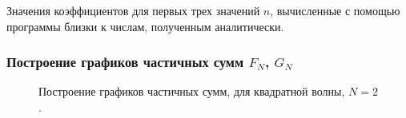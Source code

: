 \documentclass[a5paper, 10pt]{article}
\theoremstyle{definition}
\theoremstyle{plain}
\theoremstyle{remark}
\begin{document}
Значения коэффициентов для первых трех значений $n$, вычисленные с помощью программы близки к числам, полученным аналитически.

\subsubsection{Построение графиков частичных сумм $F_N$, $G_N$}

\begin{figure}[h]
\begin{minipage}[h]{0.5\linewidth}
\end{minipage}
\hfill
\begin{minipage}[h]{0.5\linewidth}
\end{minipage}
\caption{Построение графиков частичных сумм, для квадратной волны, $N=2$.}
\end{figure}
\end{document}
